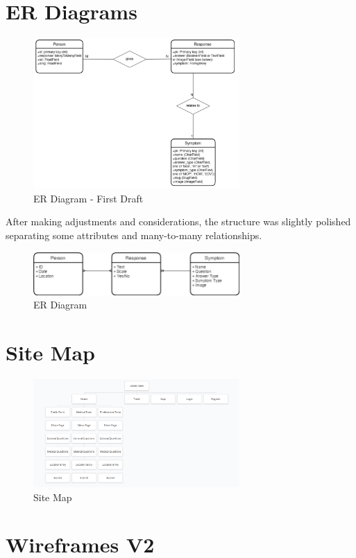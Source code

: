 \documentclass{l3proj}
\begin{document}
\section{ER Diagrams}
\begin{figure}[H]
  \centering
    \includegraphics[width=0.7\textwidth]{images/DBV1.png}
  \caption{ER Diagram - First Draft}
  \label{fig:DBV1}
\end{figure}

After making adjustments and considerations, the structure was slightly polished separating some attributes and many-to-many relationships.

\begin{figure}[H]
  \centering
    \includegraphics[width=0.7\textwidth]{images/DBV2.png}
  \caption{ER Diagram}
  \label{fig:DBV2}
\end{figure}



\newpage

\section{Site Map}
\begin{figure}[H]
  \centering
    \includegraphics[width=0.7\textwidth]{images/SiteMap.png}
  \caption{Site Map}
  \label{fig:SMV1}
\end{figure}

\section{Wireframes V2}
\end{document}
